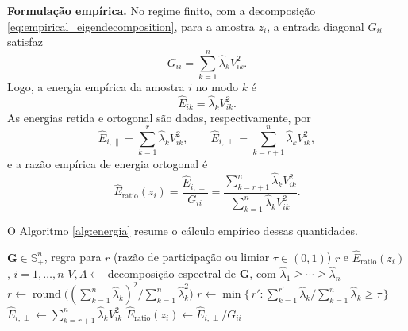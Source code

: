 \textbf{Formulação empírica.} No regime finito, com a decomposição \eqref{eq:empirical_eigendecomposition}, para a amostra $z_i$, a entrada diagonal $G_{ii}$ satisfaz
\begin{equation}\label{eq:empirical_total_energy}
    G_{ii}
    =
    \sum_{k=1}^{n}
    \widehat{\lambda}_k V_{ik}^2.
\end{equation}
Logo, a energia empírica da amostra $i$ no modo $k$ é
\begin{equation}\label{eq:empirical_mode_energy}
    \widehat{E}_{ik}
    =
    \widehat{\lambda}_k V_{ik}^2.
\end{equation}
As energias retida e ortogonal são dadas, respectivamente, por
\begin{equation}\label{eq:empirical_energies}
    \widehat{E}_{i,\parallel}
    =
    \sum_{k=1}^{r}
    \widehat{\lambda}_k V_{ik}^2,
    \qquad
    \widehat{E}_{i,\perp}
    =
    \sum_{k=r+1}^{n}
    \widehat{\lambda}_k V_{ik}^2,
\end{equation}
e a razão empírica de energia ortogonal é
\begin{equation}\label{eq:empirical_e_ratio}
    \widehat{E}_{\mathrm{ratio}}(z_i)
    =
    \frac{
        \widehat{E}_{i,\perp}
    }{
        G_{ii}
    }
    =
    \frac{
        \sum_{k=r+1}^{n}
        \widehat{\lambda}_k V_{ik}^2
    }{
        \sum_{k=1}^{n}
        \widehat{\lambda}_k V_{ik}^2
    }.
\end{equation}
 
O Algoritmo \ref{alg:energia} resume o cálculo empírico dessas quantidades.

\begin{algorithm}[htbp]
\caption{Subespaço retido e razão de energia ortogonal}
\label{alg:energia}
\begin{algorithmic}[1]
\Require $\mathbf{G} \in \mathbb{S}_+^n$, regra para $r$ (razão de participação ou limiar $\tau \in (0,1)$)
\Ensure $r$ e $\widehat{E}_{\mathrm{ratio}}(z_i)$, $i = 1,\dots,n$
\State $V, \Lambda \gets$ decomposição espectral de $\mathbf{G}$, com $\widehat{\lambda}_1 \geq \cdots \geq \widehat{\lambda}_n$
    \State $r \gets \operatorname{round}\bigl( (\sum_{k=1}^{n} \widehat{\lambda}_k)^2 \big/ \sum_{k=1}^{n} \widehat{\lambda}_k^2 \bigr)$ 
\Else
    \State $r \gets \min\{\, r' : \sum_{k=1}^{r'} \widehat{\lambda}_k \big/ \sum_{k=1}^{n} \widehat{\lambda}_k \geq \tau \,\}$ 
\EndIf
{}
    \State $\widehat{E}_{i,\perp} \gets \sum_{k=r+1}^{n} \widehat{\lambda}_k V_{ik}^2$
    \State $\widehat{E}_{\mathrm{ratio}}(z_i) \gets \widehat{E}_{i,\perp} / G_{ii}$
\EndFor
\end{algorithmic}
\end{algorithm}

